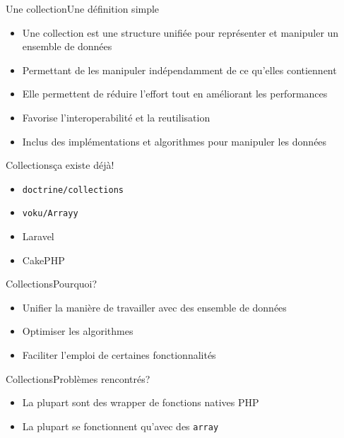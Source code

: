 \begin{frame}{Une collection}{Une définition simple}
    \begin{itemize}[<+->]
        \item Une collection est une structure unifiée pour représenter et manipuler un ensemble de données
        \item Permettant de les manipuler indépendamment de ce qu'elles contiennent
        \item Elle permettent de réduire l'effort tout en améliorant les performances
        \item Favorise l'interoperabilité et la reutilisation
        \item Inclus des implémentations et algorithmes pour manipuler les données
    \end{itemize}
\end{frame}

\begin{frame}{Collections}{ça existe déjà!}
    \begin{itemize}[<+->]
        \item \texttt{doctrine/collections}
        \item \texttt{voku/Arrayy}
        \item Laravel
        \item CakePHP
    \end{itemize}
\end{frame}

\begin{frame}{Collections}{Pourquoi?}
    \begin{itemize}[<+->]
        \item Unifier la manière de travailler avec des ensemble de données
        \item Optimiser les algorithmes
        \item Faciliter l'emploi de certaines fonctionnalités
    \end{itemize}
\end{frame}

\begin{frame}{Collections}{Problèmes rencontrés?}
    \begin{itemize}[<+->]
        \item La plupart sont des wrapper de fonctions natives PHP
        \item La plupart se fonctionnent qu'avec des \texttt{array}
    \end{itemize}
\end{frame}

